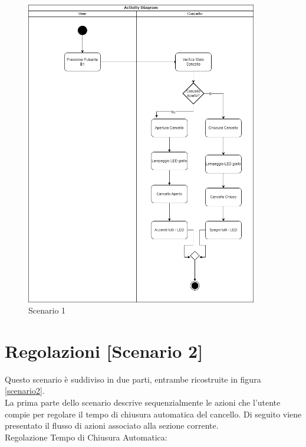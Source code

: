 \begin{figure}[H]
    \centering
    \includegraphics[width=0.9\textwidth]{figures/scenario1.drawio.png}
    \caption{Scenario 1}
    \label{scenario1}
\end{figure}


\section{Regolazioni [Scenario 2]}
\noindent Questo scenario è suddiviso in due parti, entrambe ricostruite in figura \ref{scenario2}. \\

La prima parte dello scenario descrive sequenzialmente le azioni che l’utente compie per regolare il tempo di chiusura automatica del cancello.
Di seguito viene presentato il flusso di azioni associato alla sezione corrente. \\

\noindent Regolazione Tempo di Chiusura Automatica:

